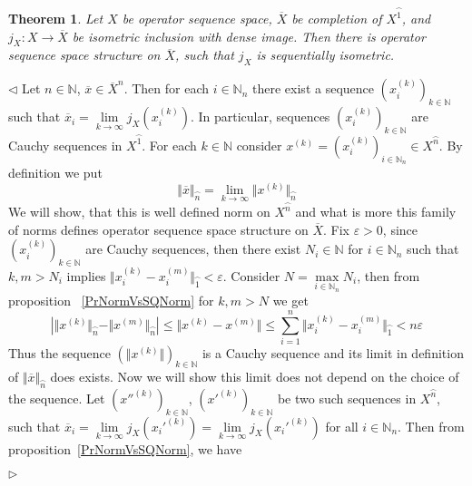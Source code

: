 \documentclass[12pt]{article}
\newtheorem{theorem}{Theorem}[subsection]
\newenvironment{proof}{\par $\triangleleft$}{$\triangleright$}
\begin{document}
\begin{theorem}\label{ThSQCompl}
Let $X$ be operator sequence space, $\overline{X}$ be completion of 
$X^{\wideparen{1}}$, and $j_X:X\to \overline{X}$ be isometric inclusion with 
dense image. Then there is operator sequence space structure on $\overline{X}$, 
such that $j_X$ is sequentially isometric.
\end{theorem}
\begin{proof} Let $n\in\mathbb{N}$, $\overline{x}\in \overline{X}^{n}$. Then 
for each $i\in\mathbb{N}_n$ there exist a sequence 
${(x_i^{(k)})}_{k\in\mathbb{N}}$ such that 
$\overline{x}_i=\lim\limits_{k\to\infty}j_X(x_i^{(k)})$. 
In particular, sequences ${(x_i^{(k)})}_{k\in\mathbb{N}}$ are Cauchy 
sequences in $X^{\wideparen{1}}$. For each $k\in\mathbb{N}$ consider 
$x^{(k)}={(x_i^{(k)})}_{i\in\mathbb{N}_n}\in X^{\wideparen{n}}$. By definition 
we put
$$
\Vert\overline{x}\Vert_{\wideparen{n}}=\lim\limits_{k\to\infty}\Vert
x^{(k)}\Vert_{\wideparen{n}}
$$
We will show, that this is well defined norm on $X^{\wideparen{n}}$ and what is 
more this family of norms defines operator sequence space structure on 
$\overline{X}$. Fix $\varepsilon>0$, since ${(x_i^{(k)})}_{k\in\mathbb{N}}$ are 
Cauchy sequences, then there exist $N_i\in\mathbb{N}$ for $i\in\mathbb{N}_n$ 
such that $k,m>N_i$ implies 
$\Vert x_i^{(k)}-x_i^{(m)}\Vert_{\wideparen{1}}<\varepsilon$. Consider 
$N=\max\limits_{i\in\mathbb{N}_n}N_i$, then from proposition 
~\ref{PrNormVsSQNorm} for $k,m>N$ we get
$$
\left|\Vert x^{(k)}\Vert_{\wideparen{n}}-\Vert
x^{(m)}\Vert_{\wideparen{n}}\right|\leq\Vert
x^{(k)}-x^{(m)}\Vert\leq\sum\limits_{i=1}^n\Vert
x_i^{(k)}-x_i^{(m)}\Vert_{\wideparen{1}}<n\varepsilon
$$
Thus the sequence ${(\Vert x^{(k)}\Vert)}_{k\in\mathbb{N}}$ is a Cauchy sequence 
and its limit in definition of $\Vert \overline{x}\Vert_{\wideparen{n}}$ does 
exists. Now we will show this limit does not depend on the choice of the 
sequence. Let ${(x''^{(k)})}_{k\in\mathbb{N}}$, ${(x'^{(k)})}_{k\in\mathbb{N}}$ 
be two such sequences in $X^{\wideparen{n}}$, such that 
$\overline{x}_i
=\lim\limits_{k\to\infty} j_X(x_i'^{(k)})
=\lim\limits_{k\to\infty} j_X(x_i'^{(k)})$ for all $i\in\mathbb{N}_n$. Then 
from proposition~\ref{PrNormVsSQNorm}, we have 


\end{proof}
\end{document}
